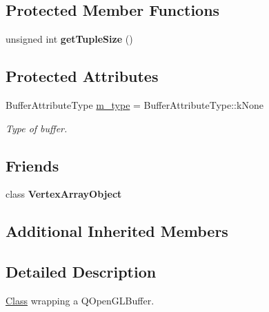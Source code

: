 \subsection*{Protected Member Functions}
\begin{DoxyCompactItemize}
\item 
\mbox{\label{classrev_1_1_g_l_1_1_buffer_object_a509bf0f1c6cde4665010d692f4d6fe4b}} 
unsigned int {\bfseries get\+Tuple\+Size} ()
\end{DoxyCompactItemize}
\subsection*{Protected Attributes}
\begin{DoxyCompactItemize}
\item 
\mbox{\label{classrev_1_1_g_l_1_1_buffer_object_ac3a7ef73c305ba1d392345ec7c68373a}} 
Buffer\+Attribute\+Type \mbox{\hyperlink{classrev_1_1_g_l_1_1_buffer_object_ac3a7ef73c305ba1d392345ec7c68373a}{m\+\_\+type}} = Buffer\+Attribute\+Type\+::k\+None
\begin{DoxyCompactList}\small\item\em Type of buffer. \end{DoxyCompactList}\end{DoxyCompactItemize}
\subsection*{Friends}
\begin{DoxyCompactItemize}
\item 
\mbox{\label{classrev_1_1_g_l_1_1_buffer_object_ad2dda0fc1c45d05c114ef20cdcbd1acc}} 
class {\bfseries Vertex\+Array\+Object}
\end{DoxyCompactItemize}
\subsection*{Additional Inherited Members}


\subsection{Detailed Description}
\mbox{\hyperlink{struct_class}{Class}} wrapping a Q\+Open\+G\+L\+Buffer. 

